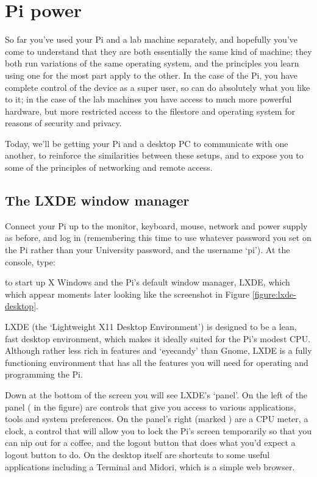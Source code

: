 \chapter{Pi power}


So far you've used your Pi and a lab machine separately, and hopefully you've come to understand that they are both essentially the same kind of machine; they both run variations of the same operating system, and the principles you learn using one for the most part apply to the other. In the case of the Pi, you have complete control of the device as a super user, so can do absolutely what you like to it; in the case of the lab machines you have access to much more powerful hardware, but more restricted access to the filestore and operating system for reasons of security and privacy. 

Today, we'll be getting your Pi and a desktop PC to communicate with one another, to reinforce the similarities between these setups, and to expose you to some of the principles of networking and remote access. 

\section{The LXDE window manager}

Connect your Pi up to the monitor, keyboard, mouse, network and power supply as before, and log in (remembering this time to use whatever password you set on the Pi rather than your University password, and the username `pi'). At the console, type:


to start up X Windows and the Pi's default window manager, LXDE, which which appear moments later looking like the screenshot in Figure \ref{figure:lxde-desktop}. 

LXDE (the `Lightweight X11 Desktop Environment') is designed to be a lean, fast desktop environment, which makes it ideally suited for the Pi's modest CPU. Although rather less rich in features and `eyecandy' than Gnome, LXDE is a fully functioning environment that has all the features you will need for operating and programming the Pi. 

Down at the bottom of the screen you will see LXDE's `panel'. On the left of the panel (\protect{} in the figure) are controls that give you access to various applications, tools and system preferences. On the panel's right (marked \protect{}) are a CPU meter, a clock, a control that will allow you to lock the Pi's screen temporarily so that you can nip out for a coffee, and the logout button that does what you'd expect a logout button to do. On the desktop itself are shortcuts to some useful applications including a Terminal and Midori, which is a simple web browser. 

